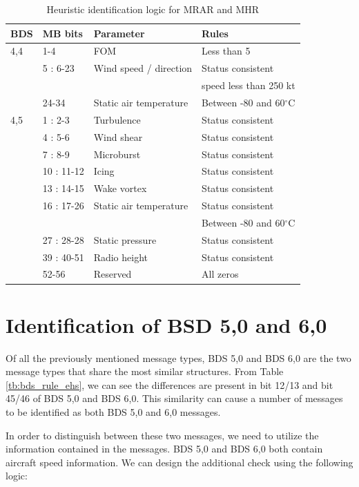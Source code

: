\begin{table}
\footnotesize
\centering
\small
\caption{Heuristic identification logic for MRAR and MHR}
\label{tb:bds_rule_mrar}
\begin{tabular}{|l|l|l|l|}
\hline
\textbf{BDS} & \textbf{MB bits} & \textbf{Parameter} & \textbf{Rules} \\ \hline \hline
4,4 & 1-4 & FOM & Less than 5 \\ \cline{2-4} 
& 5 : 6-23 & Wind speed / direction & Status consistent \\ 
& & & speed less than 250 kt \\ \cline{2-4} 
& 24-34 & Static air temperature & Between -80 and 60$^\circ$C \\ \hline \hline
4,5 & 1 : 2-3 & Turbulence & Status consistent \\ \cline{2-4} 
& 4 : 5-6 & Wind shear & Status consistent \\ \cline{2-4} 
& 7 : 8-9 & Microburst & Status consistent \\ \cline{2-4} 
& 10 : 11-12 & Icing & Status consistent \\ \cline{2-4} 
& 13 : 14-15 & Wake vortex & Status consistent \\ \cline{2-4} 
& 16 : 17-26 & Static air temperature & Status consistent \\
& & & Between -80 and 60$^\circ$C \\ \cline{2-4} 
& 27 : 28-28 & Static pressure & Status consistent \\ \cline{2-4} 
& 39 : 40-51 & Radio height & Status consistent \\ \cline{2-4} 
& 52-56 & Reserved & All zeros \\ \hline
\end{tabular}
\end{table}




\section{Identification of BSD 5,0 and 6,0}

Of all the previously mentioned message types, BDS 5,0 and BDS 6,0 are the two message types that share the most similar structures. From Table \ref{tb:bds_rule_ehs}, we can see the differences are present in bit 12/13 and bit 45/46 of BDS 5,0 and BDS 6,0. This similarity can cause a number of messages to be identified as both BDS 5,0 and 6,0 messages.

In order to distinguish between these two messages, we need to utilize the information contained in the messages. BDS 5,0 and BDS 6,0 both contain aircraft speed information. We can design the additional check using the following logic:

